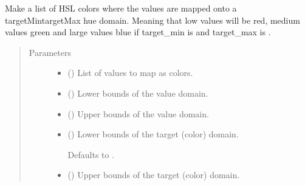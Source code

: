\documentclass[letterpaper,10pt,english]{sphinxmanual}
\begin{document}

\begin{fulllineitems}
\label{\detokenize{cockatoo:cockatoo.utilities.map_values_as_colors}}
Make a list of HSL colors where the values are mapped onto a
targetMin\sphinxhyphen{}targetMax hue domain. Meaning that low values will be red, medium
values green and large values blue if target\_min is  and target\_max
is .
\begin{quote}\begin{description}
\item[{Parameters}] \leavevmode\begin{itemize}
\item {} 
 () \textendash{} List of values to map as colors.

\item {} 
 () \textendash{} Lower bounds of the value domain.

\item {} 
 () \textendash{} Upper bounds of the value domain.

\item {} 
 (\sphinxstyleliteralemphasis{\sphinxupquote{, }}) \textendash{} 
Lower bounds of the target (color) domain.

Defaults to .


\item {} 
 (\sphinxstyleliteralemphasis{\sphinxupquote{, }}) \textendash{} 
Upper bounds of the target (color) domain.


\end{itemize}
\end{description}
\end{quote}
\end{fulllineitems}
\end{document}
